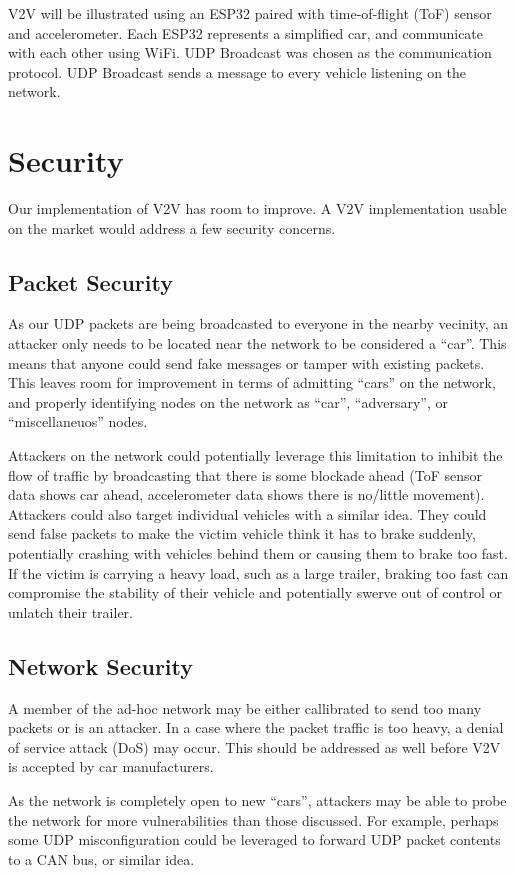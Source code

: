 \documentclass[conference]{IEEEtran}
\begin{document}
V2V will be illustrated using an ESP32 paired with time-of-flight (ToF) sensor
and accelerometer. Each ESP32 represents a simplified car, and communicate with
each other using WiFi. UDP Broadcast was chosen as the communication protocol. 
UDP Broadcast sends a message to every vehicle listening on the network.

\section{Security}
Our implementation of V2V has room to improve. A V2V implementation usable on
the market would address a few security concerns.

\subsection{Packet Security}
As our UDP packets are being broadcasted to everyone in the nearby vecinity, an
attacker only needs to be located near the network to be considered a ``car''.
This means that anyone could send fake messages or tamper with existing packets.
This leaves room for improvement in terms of admitting ``cars'' on the network,
and properly identifying nodes on the network as ``car'', ``adversary'', or
``miscellaneuos'' nodes.

Attackers on the network could potentially leverage this limitation to inhibit
the flow of traffic by broadcasting that there is some blockade ahead (ToF
sensor data shows car ahead, accelerometer data shows there is no/little
movement). Attackers could also target individual vehicles with a similar idea.
They could send false packets to make the victim vehicle think it has to brake
suddenly, potentially crashing with vehicles behind them or causing them to
brake too fast. If the victim is carrying a heavy load, such as a large trailer,
braking too fast can compromise the stability of their vehicle and potentially
swerve out of control or unlatch their trailer.

\subsection{Network Security}
A member of the ad-hoc network may be either callibrated to send too many
packets or is an attacker. In a case where the packet traffic is too heavy, a
denial of service attack (DoS) may occur. This should be addressed as well
before V2V is accepted by car manufacturers.

As the network is completely open to new ``cars'', attackers may be able to
probe the network for more vulnerabilities than those discussed. For example,
perhaps some UDP misconfiguration could be leveraged to forward UDP packet
contents to a CAN bus, or similar idea.
\end{document}
